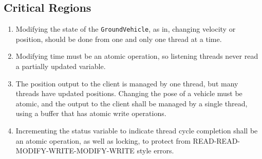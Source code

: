 \documentclass{article}
\begin{document}
\subsection{Critical Regions}
\begin{enumerate}
	\item Modifying the state of the \verb|GroundVehicle|, as in, changing velocity or position, should be done from one and only one thread at a time.
	\item Modifying time must be an atomic operation, so listening threads never read a partially updated variable.
	\item The position output to the client is managed by one thread, but many threads have updated positions.  Changing the pose of a vehicle must be atomic, and the output to the client shall be managed by a single thread, using a buffer that has atomic write operations.
	\item Incrementing the status variable to indicate thread cycle completion shall be an atomic operation, as well as locking, to protect from READ-READ-MODIFY-WRITE-MODIFY-WRITE style errors.
\end{enumerate}
\end{document}

